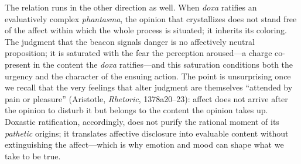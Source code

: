 \documentclass{article}
\begin{document}
The relation runs in the other direction as well. When \textit{doxa} ratifies an evaluatively complex \textit{phantasma}, the opinion that crystallizes does not stand free of the affect within which the whole process is situated; it inherits its coloring. The judgment that the beacon signals danger is no affectively neutral proposition; it is saturated with the fear the perception aroused---a charge co-present in the content the \textit{doxa} ratifies---and this saturation conditions both the urgency and the character of the ensuing action. The point is unsurprising once we recall that the very feelings that alter judgment are themselves ``attended by pain or pleasure'' (Aristotle, \textit{Rhetoric}, 1378a20--23): affect does not arrive after the opinion to disturb it but belongs to the content the opinion takes up. Doxastic ratification, accordingly, does not purify the rational moment of its \textit{pathetic} origins; it translates affective disclosure into evaluable content without extinguishing the affect---which is why emotion and mood can shape what we take to be true.
\end{document}
